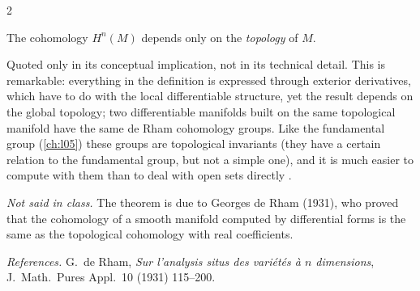 \begin{paracol}{2}
\begin{theorem}\label{thm:gr-derham}
The cohomology $H^n(M)$ depends only on the \emph{topology} of $M$.  
\end{theorem}
Quoted only in its conceptual implication, not in its technical detail. This is remarkable: everything in the definition is expressed through exterior derivatives, which have to do with the local differentiable structure, yet the result depends on the global topology; two differentiable manifolds built on the same topological manifold have the same de Rham cohomology groups. Like the fundamental group (\cref{ch:l05})
these groups are topological invariants (they have a certain relation to the fundamental group, but not a simple one), and it is much easier to compute with them than to deal with open sets directly      .
\begin{history}[de Rham]
\emph{Not said in class.} The theorem is due to Georges de Rham (1931), who proved that the cohomology of a smooth manifold computed by differential forms is the same as the topological cohomology with real coefficients.\par
\smallskip
\emph{References.} G.~de Rham, \emph{Sur l'analysis situs des vari\'et\'es \`a $n$ dimensions}, J.\ Math.\ Pures Appl.\ 10 (1931) 115--200.
\end{history}


\end{paracol}

